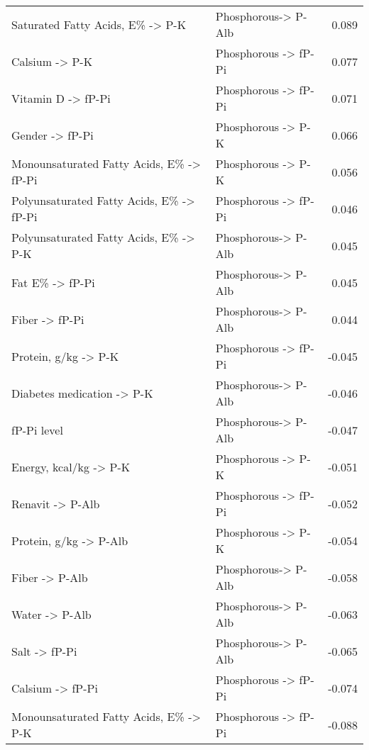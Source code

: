 \documentclass[border=1mm, preview]{standalone}
\begin{document}
\begin{table}[H]
\begin{tabular}[t]{llr}
\addlinespace
Saturated Fatty Acids, E\% -> P-K & Phosphorous-> P-Alb & 0.089\\
Calsium -> P-K & Phosphorous -> fP-Pi & 0.077\\
Vitamin D -> fP-Pi & Phosphorous -> fP-Pi & 0.071\\
Gender -> fP-Pi & Phosphorous -> P-K & 0.066\\
Monounsaturated Fatty Acids, E\% -> fP-Pi & Phosphorous -> P-K & 0.056\\
\addlinespace
Polyunsaturated Fatty Acids, E\% -> fP-Pi & Phosphorous -> fP-Pi & 0.046\\
Polyunsaturated Fatty Acids, E\% -> P-K & Phosphorous-> P-Alb & 0.045\\
Fat E\% -> fP-Pi & Phosphorous-> P-Alb & 0.045\\
Fiber -> fP-Pi & Phosphorous-> P-Alb & 0.044\\
Protein, g/kg -> P-K & Phosphorous -> fP-Pi & -0.045\\
\addlinespace
Diabetes medication -> P-K & Phosphorous-> P-Alb & -0.046\\
fP-Pi level & Phosphorous-> P-Alb & -0.047\\
Energy, kcal/kg -> P-K & Phosphorous -> P-K & -0.051\\
Renavit -> P-Alb & Phosphorous -> fP-Pi & -0.052\\
Protein, g/kg -> P-Alb & Phosphorous -> P-K & -0.054\\
\addlinespace
Fiber -> P-Alb & Phosphorous-> P-Alb & -0.058\\
Water -> P-Alb & Phosphorous-> P-Alb & -0.063\\
Salt -> fP-Pi & Phosphorous-> P-Alb & -0.065\\
Calsium -> fP-Pi & Phosphorous -> fP-Pi & -0.074\\
Monounsaturated Fatty Acids, E\% -> P-K & Phosphorous -> fP-Pi & -0.088\\
\bottomrule
\end{tabular}
\end{table}
\end{document}
